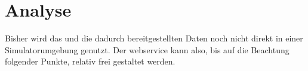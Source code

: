 \chapter{Analyse}\label{ch:analyse}
	Bisher wird das \lfidSystem{}
	und die dadurch bereitgestellten Daten noch nicht direkt in einer Simulatorumgebung genutzt.
	Der \gls{webservice} kann also,
	bis auf die Beachtung folgender Punkte,
	relativ frei gestaltet werden.

	
	
	
	